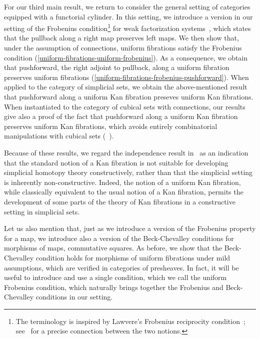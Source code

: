 \documentclass[reqno,10pt,a4paper,oneside,draft]{amsart}
\begin{document}
For our third main result, we return to consider the general setting of categories equipped with a functorial cylinder.
In this setting, we introduce a version in our setting of the Frobenius condition\footnote{The terminology is inspired by Lawvere's Frobenius reciprocity condition~\cite{lawvere-equality}; see~\cite{clementino:frobenius} for a precise connection between the two notions.} for weak factorization systems~\cite{garner:types-omega-groupoids}, which states that the pullback along a right map preserves left maps.
We then show that, under the assumption of connections, uniform fibrations satisfy the Frobenius condition (\cref{uniform-fibrations-uniform-frobenius}).
As a consequence, we obtain that pushforward, \ie the right adjoint to pullback, along a uniform fibration preserves uniform fibrations (\cref{uniform-fibrations-frobenius-pushforward}).
When applied to the category of simplicial sets, we obtain the above-mentioned result that pushforward along a uniform Kan fibration preseves uniform Kan fibrations.
When instantiated to the category of cubical sets with connections, our results give also a proof of the fact that pushforward along a uniform Kan fibration preserves uniform Kan fibrations, which avoids entirely combinatorial manipulations with cubical sets (\cf~\cite{coquand-face,coquand-variation,huber-thesis}).

Because of these results, we regard the independence result in~\cite{coquand-non-constructivity-kan} as an indication that the standard notion of a Kan fibration is not suitable for developing simplicial homotopy theory constructively, rather than that the simplicial setting is inherently non-constructive.
Indeed, the notion of a uniform Kan fibration, while classically equivalent to the usual notion of a Kan fibration, permits the development of some parts of the theory of Kan fibrations in a constructive setting in simplicial sets.

Let us also mention that, just as we introduce a version of the Frobenius property for a map, we introduce also a version of the Beck-Chevalley conditions for morphisms of maps, \ie commutative squares.
As before, we show that the Beck-Chevalley condition holds for morphisms of uniform fibrations under mild assumptions, which are verified in categories of presheaves.
In fact, it will be useful to introduce and use a single condition, which we call the uniform Frobenius condition, which naturally brings together the Frobenius and Beck-Chevalley conditions in our setting.
\end{document}
